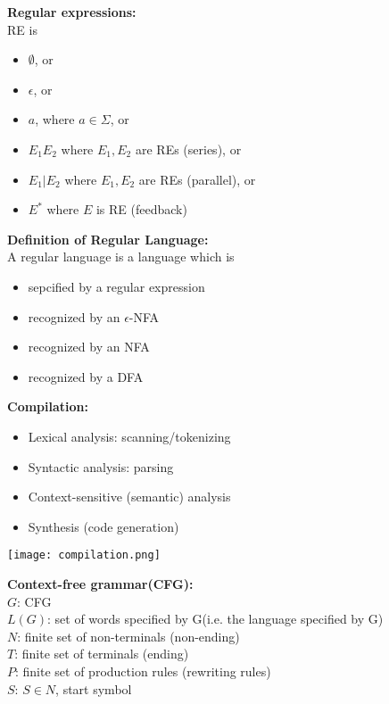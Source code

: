 \documentclass[12pt]{article}
\begin{document}
\clearpage
\noindent
\textbf{Regular expressions:}\\

\noindent
RE is 
\begin{itemize}
	\renewcommand\labelitemi{--}
	\item $\emptyset$, or
	\item $\epsilon$, or
	\item $a$, where $a \in \Sigma$, or
	\item $E_1E_2$ where $E_1, E_2$ are REs (series), or
	\item $E_1|E_2$ where $E_1, E_2$ are REs (parallel), or
	\item $E^{\ast}$ where $E$ is RE (feedback)
\end{itemize}

\noindent
\textbf{Definition of Regular Language:}\\

\noindent
A regular language is a language which is
\begin{itemize}
	\renewcommand\labelitemi{--}
	\item sepcified by a regular expression
	\item recognized by an $\epsilon$-NFA
	\item recognized by an NFA
	\item recognized by a DFA
\end{itemize}
\vspace{2mm}
\begin{minipage}{0.6\linewidth}
	\textbf{Compilation:}
	\begin{itemize}
		\renewcommand\labelitemi{--}
		\item Lexical analysis: scanning/tokenizing
		\item Syntactic analysis: parsing
		\item Context-sensitive (semantic) analysis
		\item Synthesis (code generation)
	\end{itemize}
\end{minipage}
\begin{minipage}{0.4\linewidth}
	\texttt{[image: compilation.png]}
\end{minipage}


\clearpage
\noindent
\textbf{Context-free grammar(CFG):}\\

\noindent
$G$: CFG\\
$L(G)$: set of words specified by G(i.e. the language specified by G)\\
$N$: finite set of non-terminals (non-ending)\\
$T$: finite set of terminals (ending)\\
$P$: finite set of production rules (rewriting rules)\\
$S$: $S \in N$, start symbol\\
\end{document}
